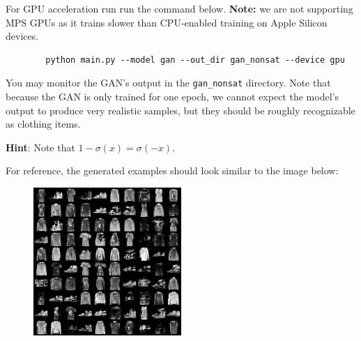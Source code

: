 \begin{enumerate}[label=(\alph*)]
    For GPU acceleration run run the command below. \textbf{Note:} we are not supporting MPS GPUs as it trains slower than CPU-enabled training on Apple Silicon devices.
    \begin{verbatim}
        python main.py --model gan --out_dir gan_nonsat --device gpu
    \end{verbatim} 
    
    You may monitor the GAN’s output in the \texttt{gan\_nonsat} directory. Note that because the GAN is only trained for one epoch, 
    we cannot expect the model’s output to produce very realistic samples, but they should be roughly recognizable as clothing items.

    \textbf{Hint}: Note that $1-\sigma(x) = \sigma(-x)$.

    For reference, the generated examples should look similar to the image below:
    \begin{figure}[h]
        \centering
        \includegraphics[width=0.5\textwidth]{./figures/gan_nonsat_0900}
    \end{figure}

\end{enumerate}

